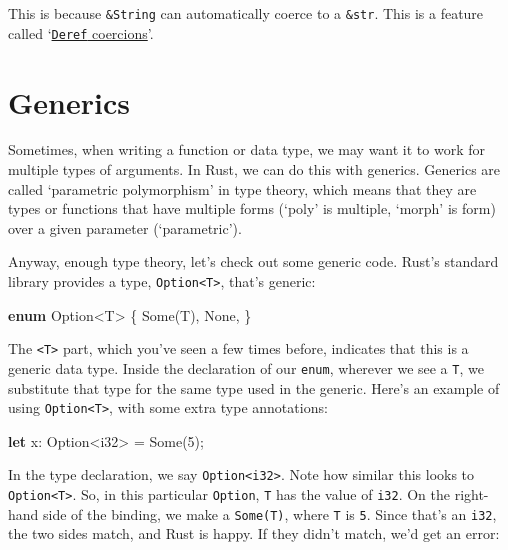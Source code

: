 \documentclass[a4paper,]{book}
\newenvironment{Shaded}{\begin{snugshade}}{\end{snugshade}}
\newcommand{\KeywordTok}[1]{\textcolor[rgb]{0.13,0.29,0.53}{\textbf{{#1}}}}
\newcommand{\DataTypeTok}[1]{\textcolor[rgb]{0.13,0.29,0.53}{{#1}}}
\newcommand{\DecValTok}[1]{\textcolor[rgb]{0.00,0.00,0.81}{{#1}}}
\newcommand{\ConstantTok}[1]{\textcolor[rgb]{0.00,0.00,0.00}{{#1}}}
\newcommand{\NormalTok}[1]{{#1}}
\begin{document}
This is because \texttt{\&String} can automatically coerce to a
\texttt{\&str}. This is a feature called
`\protect\hyperlink{sec--deref-coercions}{\texttt{Deref} coercions}'.

\hypertarget{sec--generics}{\section{Generics}\label{sec--generics}}

Sometimes, when writing a function or data type, we may want it to work
for multiple types of arguments. In Rust, we can do this with generics.
Generics are called `parametric polymorphism' in type theory, which
means that they are types or functions that have multiple forms (`poly'
is multiple, `morph' is form) over a given parameter (`parametric').

Anyway, enough type theory, let's check out some generic code. Rust's
standard library provides a type,
\texttt{Option\textless{}T\textgreater{}}, that's generic:

\begin{Shaded}
\begin{Highlighting}[]
\KeywordTok{enum} \DataTypeTok{Option}\NormalTok{<T> \{}
    \ConstantTok{Some}\NormalTok{(T),}
    \ConstantTok{None}\NormalTok{,}
\NormalTok{\}}
\end{Highlighting}
\end{Shaded}

The \texttt{\textless{}T\textgreater{}} part, which you've seen a few
times before, indicates that this is a generic data type. Inside the
declaration of our \texttt{enum}, wherever we see a \texttt{T}, we
substitute that type for the same type used in the generic. Here's an
example of using \texttt{Option\textless{}T\textgreater{}}, with some
extra type annotations:

\begin{Shaded}
\begin{Highlighting}[]
\KeywordTok{let} \NormalTok{x: }\DataTypeTok{Option}\NormalTok{<}\DataTypeTok{i32}\NormalTok{> = }\ConstantTok{Some}\NormalTok{(}\DecValTok{5}\NormalTok{);}
\end{Highlighting}
\end{Shaded}

In the type declaration, we say
\texttt{Option\textless{}i32\textgreater{}}. Note how similar this looks
to \texttt{Option\textless{}T\textgreater{}}. So, in this particular
\texttt{Option}, \texttt{T} has the value of \texttt{i32}. On the
right-hand side of the binding, we make a \texttt{Some(T)}, where
\texttt{T} is \texttt{5}. Since that's an \texttt{i32}, the two sides
match, and Rust is happy. If they didn't match, we'd get an error:
\end{document}
